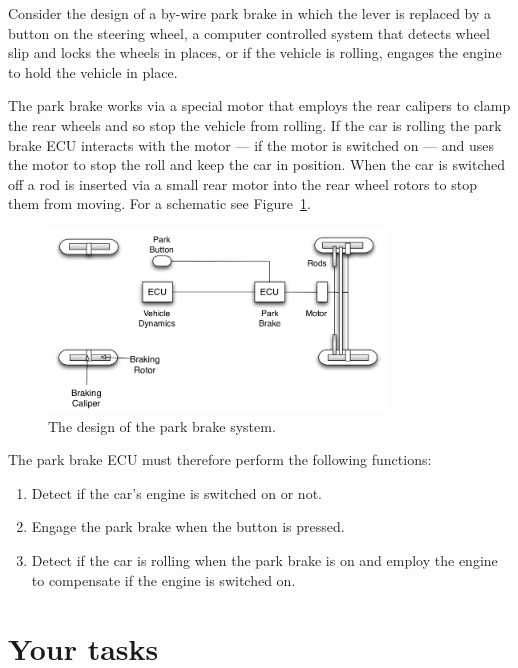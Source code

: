 \documentclass{article}
\begin{document}
Consider the design of a by-wire park brake in which the lever is
replaced by a button on the steering wheel, a computer controlled
system that detects wheel slip and locks the wheels in places, or if
the vehicle is rolling, engages the engine to hold the vehicle in
place.

The park brake works via a special motor that employs the rear
calipers to clamp the rear wheels and so stop the vehicle from
rolling.  If the car is rolling the park brake ECU interacts with the
motor --- if the motor is switched on --- and uses the motor to stop
the roll and keep the car in position. When the car is switched off a
rod is inserted via a small rear motor into the rear wheel rotors to
stop them from moving. For a schematic see Figure~\ref{fig:pb}.
\begin{figure}[htbp]
\centering
  \includegraphics[width=0.80\textwidth]{./figs/ParkBrake}
  \caption{The design of the park brake system.}
  \label{fig:pb}
\end{figure}

The park brake ECU must therefore perform the following functions:
\begin{enumerate}
  \item Detect if the car's engine is switched on or not.
\item Engage the park brake when the button is pressed. 
\item Detect if the car is rolling when the park brake is on and
  employ the engine to compensate if the engine is switched on.
\end{enumerate}

\section*{Your tasks}
\end{document}
